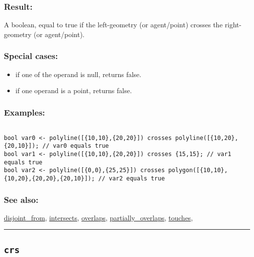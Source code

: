 \documentclass[]{book}
\providecommand{\tightlist}{%
  \setlength{\itemsep}{0pt}\setlength{\parskip}{0pt}}
\theoremstyle{definition}
\theoremstyle{definition}
\theoremstyle{definition}
\theoremstyle{remark}
\begin{document}
\subsubsection{Result:}\label{result-114}

A boolean, equal to true if the left-geometry (or agent/point) crosses
the right-geometry (or agent/point).

\subsubsection{Special cases:}\label{special-cases-44}

\begin{itemize}
\tightlist
\item
  if one of the operand is null, returns false.\\
\item
  if one operand is a point, returns false.
\end{itemize}

\subsubsection{Examples:}\label{examples-89}

\begin{verbatim}
 
bool var0 <- polyline([{10,10},{20,20}]) crosses polyline([{10,20},{20,10}]); // var0 equals true 
bool var1 <- polyline([{10,10},{20,20}]) crosses {15,15}; // var1 equals true 
bool var2 <- polyline([{0,0},{25,25}]) crosses polygon([{10,10},{10,20},{20,20},{20,10}]); // var2 equals true
\end{verbatim}

\subsubsection{See also:}\label{see-also-72}

\href{OperatorsDH\#disjoint_from}{disjoint\_from},
\href{OperatorsIM\#intersects}{intersects},
\href{OperatorsNR\#overlaps}{overlaps},
\href{OperatorsNR\#partially_overlaps}{partially\_overlaps},
\href{OperatorsSZ\#touches}{touches},

\begin{center}\rule{0.5\linewidth}{\linethickness}\end{center}

\subsection{\texorpdfstring{\texttt{crs}}{crs}}\label{crs}
\end{document}
